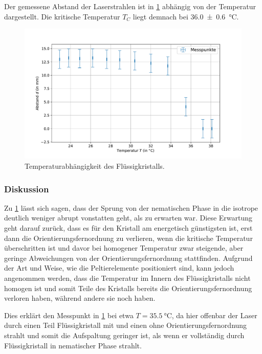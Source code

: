\documentclass[
	a4paper,
	12pt,
	pagesize,
	ngerman
]{scrartcl}
\begin{document}
	Der gemessene Abstand der Laserstrahlen ist in \cref{fig_laser} abhängig von der Temperatur dargestellt.
	Die kritische Temperatur $T_C$ liegt demnach bei \SI{36.0+-0.6}{\celsius }.
	\begin{figure}[H]
			\includegraphics[width=1\linewidth]{images/laser.pdf}
			\caption{
			Temperaturabhängigkeit des Flüssigkristalls.
			}
			\label{fig_laser}
	\end{figure}
	\subsubsection{Diskussion}

	Zu \cref{fig_laser} lässt sich sagen, dass der Sprung von der nematischen Phase in die isotrope deutlich weniger abrupt vonstatten geht, als zu erwarten war.
	Diese Erwartung geht darauf zurück, dass es für den Kristall am energetisch günstigsten ist, erst dann die Orientierungsfernordnung zu verlieren, wenn die kritische Temperatur überschritten ist und davor bei homogener Temperatur zwar steigende, aber geringe Abweichungen von der Orientierungsfernordnung stattfinden. %
	Aufgrund der Art und Weise, wie die Peltierelemente positioniert sind, kann jedoch angenommen werden, dass die Temperatur im Innern des Flüssigkristalls nicht homogen ist und somit Teile des Kristalls bereits die Orientierungsfernordnung verloren haben, während andere sie noch haben.

	Dies erklärt den Messpunkt in \cref{fig_laser} bei etwa $T= \SI{35,5}{\celsius}$, da hier offenbar der Laser durch einen Teil Flüssigkristall mit und einen ohne Orientierungsfernordnung strahlt und somit die Aufspaltung geringer ist, als wenn er vollständig durch Flüssigkristall in nematischer Phase strahlt.
\end{document}
